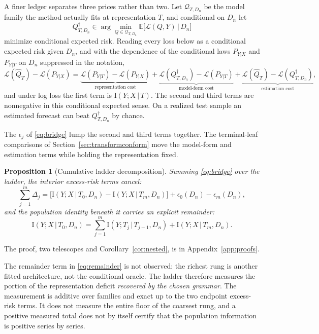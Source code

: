 \documentclass[11pt]{article}
\newtheorem{proposition}[theorem]{Proposition}
\theoremstyle{remark}
\newcommand{\E}{\mathbb{E}}
\newcommand{\I}{\mathrm{I}}
\newcommand{\given}{\,|\,}
\newcommand{\Dn}{D_n}
\newcommand{\Loss}{\mathcal{L}}
\begin{document}
A finer ledger separates three prices rather than two. Let $\mathcal Q_{T,\Dn}$ be the
model family the method actually fits at representation $T$, and conditional on $\Dn$ let
\[
Q^\dagger_{T,\Dn}\in\arg\min_{Q\in\mathcal Q_{T,\Dn}}\E\big[\Loss(Q,Y)\given\Dn\big]
\]
minimize conditional expected risk. Reading every loss below as a conditional expected risk
given $\Dn$, and with the dependence of the conditional laws $P_{Y|X}$ and $P_{Y|T}$ on
$\Dn$ suppressed in the notation,
\[
\Loss(\widehat Q_T)-\Loss(P_{Y|X})
=\underbrace{\Loss(P_{Y|T})-\Loss(P_{Y|X})}_{\text{representation cost}}
+\underbrace{\Loss(Q^\dagger_{T,\Dn})-\Loss(P_{Y|T})}_{\text{model-form cost}}
+\underbrace{\Loss(\widehat Q_T)-\Loss(Q^\dagger_{T,\Dn})}_{\text{estimation cost}},
\]
and under log loss the first term is $\I(Y;X\given T)$. The second and third terms are
nonnegative in this conditional expected sense. On a realized test sample an estimated
forecast can beat $Q^\dagger_{T,\Dn}$ by chance.

The $\epsilon_j$ of \eqref{eq:bridge} lump
the second and third terms together. The terminal-leaf comparisons of
Section~\ref{sec:transformconform} move the model-form and estimation terms while holding
the representation fixed.

\begin{proposition}[Cumulative ladder decomposition]\label{prop:cumulative}
Summing \eqref{eq:bridge} over the ladder, the interior excess-risk terms cancel:
\begin{equation}\label{eq:cumulative}
\sum_{j=1}^m\Delta_j
=\big[\I(Y;X\given T_0,\Dn)-\I(Y;X\given T_m,\Dn)\big]+\epsilon_0(\Dn)-\epsilon_m(\Dn),
\end{equation}
and the population identity beneath it carries an explicit remainder:
\begin{equation}\label{eq:remainder}
\I(Y;X\given T_0,\Dn)=\sum_{j=1}^m\I(Y;T_j\given T_{j-1},\Dn)+\I(Y;X\given T_m,\Dn).
\end{equation}
\end{proposition}

The proof, two telescopes and Corollary~\ref{cor:nested}, is in Appendix~\ref{app:proofs}.

The remainder term in \eqref{eq:remainder} is not observed: the richest rung is another fitted
architecture, not the conditional oracle. The ladder therefore measures the portion of the
representation deficit \emph{recovered by the chosen grammar}. The measurement is additive
over families and exact up to the two endpoint excess-risk terms. It does not measure the entire floor of the
coarsest rung, and a positive measured total does not by itself certify that the population
information is positive series by series.
\end{document}
